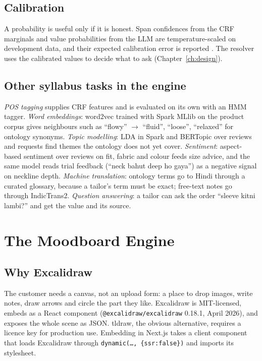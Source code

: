 \section{Calibration}

A probability is useful only if it is honest. Span confidences from the CRF marginals and value probabilities from the LLM are temperature-scaled on development data, and their expected calibration error is reported \cite{jagannatha2020calib}. The resolver uses the calibrated values to decide what to ask (Chapter~\ref{ch:design}).

\section{Other syllabus tasks in the engine}

\emph{POS tagging} supplies CRF features and is evaluated on its own with an HMM tagger. \emph{Word embeddings}: word2vec trained with Spark MLlib on the product corpus gives neighbours such as ``flowy'' $\to$ ``fluid'', ``loose'', ``relaxed'' for ontology synonyms. \emph{Topic modelling}: LDA in Spark and BERTopic \cite{grootendorst2022bertopic} over reviews and requests find themes the ontology does not yet cover. \emph{Sentiment}: aspect-based sentiment over reviews on fit, fabric and colour feeds size advice, and the same model reads trial feedback (``neck bahut deep ho gaya'') as a negative signal on neckline depth. \emph{Machine translation}: ontology terms go to Hindi through a curated glossary, because a tailor's term must be exact; free-text notes go through IndicTrans2. \emph{Question answering}: a tailor can ask the order ``sleeve kitni lambi?'' and get the value and its source.

\chapter{The Moodboard Engine}\label{ch:board}

\section{Why Excalidraw}

The customer needs a canvas, not an upload form: a place to drop images, write notes, draw arrows and circle the part they like. Excalidraw is MIT-licensed, embeds as a React component (\texttt{@excalidraw/excalidraw} 0.18.1, April 2026), and exposes the whole scene as JSON. tldraw, the obvious alternative, requires a licence key for production use. Embedding in Next.js takes a client component that loads Excalidraw through \texttt{dynamic(\ldots, \{ssr:false\})} and imports its stylesheet.

